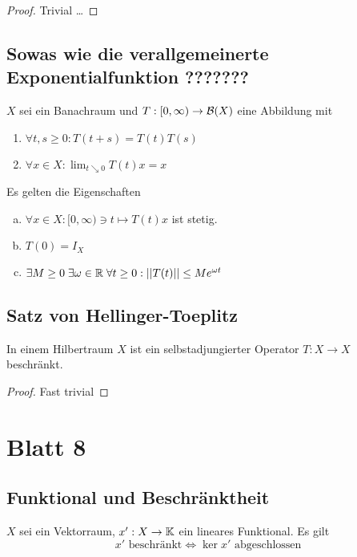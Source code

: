 \documentclass[FunkAnaskriptSS2017.tex]{subfiles}
\begin{document}
	\begin{proof}
	Trivial \dots
	\end{proof}


\subsection{ Sowas wie die verallgemeinerte Exponentialfunktion ???????}
\label{B7.4}
	$X$ sei ein Banachraum und $T:[0,\infty ) \to \mathcal{B}(X)$ eine Abbildung mit
	\begin{enumerate}
		\item $\forall t,s \geq 0 : T(t+s) = T(t)T(s)$
		\item $\forall x\in X : \lim_{t\searrow 0} T(t)x = x$
	\end{enumerate}
	Es gelten die Eigenschaften
	\begin{enumerate}[(a)]
		\item $\forall x \in X :[0,\infty) \ni t \mapsto T(t)x$ ist stetig.
		\item $T(0) = I_X$
		\item $\exists M \geq 0 \; \exists \omega \in \mathbb{R} \; \forall t \geq 0 : \left\lvert \left\lvert T(t) \right\rvert \right\rvert \leq M e^{\omega t}$
	\end{enumerate}


\subsection{ Satz von Hellinger-Toeplitz}
\label{B7.5}
	In einem Hilbertraum $X$ ist ein selbstadjungierter Operator $T : X\to X$ beschränkt.
	
	\begin{proof}
	Fast trivial
	\end{proof}		
	
	
	
\newpage
\section{ Blatt 8}


\subsection{ Funktional und Beschränktheit}
\label{B8.1}
	$X$ sei ein Vektorraum, $x' : X\to \mathbb{K}$ ein lineares Funktional. Es gilt
	$$x' \text{ beschränkt} \Leftrightarrow \ker x' \text{ abgeschlossen}$$
\end{document}
